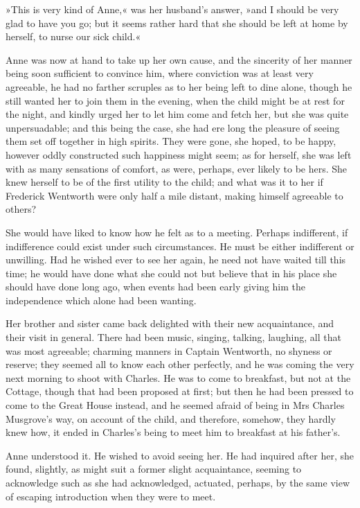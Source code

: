 »This is very kind of Anne,« was her husband's answer, »and I should be very glad to have you go; but it seems rather hard that she should be left at home by herself, to nurse our sick child.«

Anne was now at hand to take up her own cause, and the sincerity of her manner being soon sufficient to convince him, where conviction was at least very agreeable, he had no farther scruples as to her being left to dine alone, though he still wanted her to join them in the evening, when the child might be at rest for the night, and kindly urged her to let him come and fetch her, but she was quite unpersuadable; and this being the case, she had ere long the pleasure of seeing them set off together in high spirits. They were gone, she hoped, to be happy, however oddly constructed such happiness might seem; as for herself, she was left with as many sensations of comfort, as were, perhaps, ever likely to be hers. She knew herself to be of the first utility to the child; and what was it to her if Frederick Wentworth were only half a mile distant, making himself agreeable to others?

She would have liked to know how he felt as to a meeting. Perhaps indifferent, if indifference could exist under such circumstances. He must be either indifferent or unwilling. Had he wished ever to see her again, he need not have waited till this time; he would have done what she could not but believe that in his place she should have done long ago, when events had been early giving him the independence which alone had been wanting.

Her brother and sister came back delighted with their new acquaintance, and their visit in general. There had been music, singing, talking, laughing, all that was most agreeable; charming manners in Captain Wentworth, no shyness or reserve; they seemed all to know each other perfectly, and he was coming the very next morning to shoot with Charles. He was to come to breakfast, but not at the Cottage, though that had been proposed at first; but then he had been pressed to come to the Great House instead, and he seemed afraid of being in Mrs Charles Musgrove's way, on account of the child, and therefore, somehow, they hardly knew how, it ended in Charles's being to meet him to breakfast at his father's.

Anne understood it. He wished to avoid seeing her. He had inquired after her, she found, slightly, as might suit a former slight acquaintance, seeming to acknowledge such as she had acknowledged, actuated, perhaps, by the same view of escaping introduction when they were to meet.

